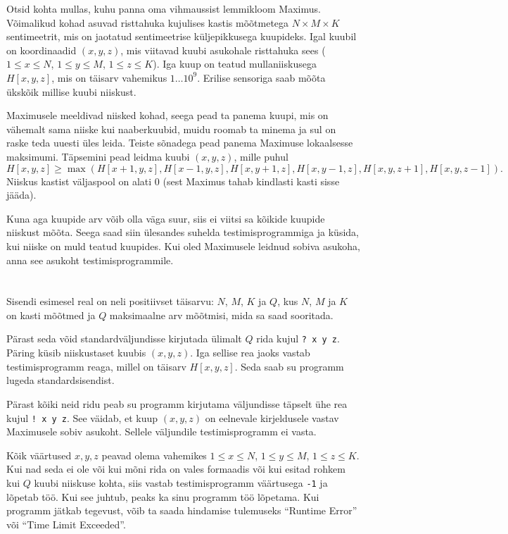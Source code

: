\ifx\boi\undefined\fi
\def\version{jury-1}

Otsid kohta mullas, kuhu panna oma vihmaussist lemmikloom Maximus. 
Võimalikud kohad asuvad risttahuka kujulises kastis mõõtmetega $N \times M \times K$ sentimeetrit, 
mis on jaotatud sentimeetrise küljepikkusega kuupideks. Igal kuubil on koordinaadid $(x,y,z)$, 
mis viitavad kuubi asukohale risttahuka sees ($1 \le x \le N$, $1 \le y \le M$, $1 \le z \le K$). 
Iga kuup on teatud mullaniiskusega $H[x,y,z]$, mis on täisarv vahemikus $1 \dots 10^9$. 
Erilise sensoriga saab mõõta ükskõik millise kuubi niiskust.

Maximusele meeldivad niisked kohad, seega pead ta panema kuupi, mis on vähemalt sama niiske kui naaberkuubid, 
muidu roomab ta minema ja sul on raske teda uuesti üles leida.
Teiste sõnadega pead panema Maximuse lokaalsesse maksimumi.
Täpsemini pead leidma kuubi $(x,y,z)$, mille puhul
$$
H[x,y,z] \ge \max(H[x+1,y,z], H[x-1,y,z], H[x,y+1,z], H[x,y-1,z], H[x,y,z+1], H[x,y,z-1]).
$$
Niiskus kastist väljaspool on alati $0$ (sest Maximus tahab kindlasti kasti sisse jääda).

Kuna aga kuupide arv võib olla väga suur, siis ei viitsi sa kõikide kuupide niiskust mõõta. Seega saad siin ülesandes suhelda testimisprogrammiga ja küsida, kui niiske on muld teatud kuupides.
Kui oled Maximusele leidnud sobiva asukoha, anna see asukoht testimisprogrammile.

\section*{\interactivity}
Sisendi esimesel real on neli positiivset täisarvu: $N$, $M$, $K$ ja $Q$, kus $N$, $M$ ja $K$ on kasti mõõtmed ja $Q$ maksimaalne arv mõõtmisi, mida sa saad sooritada.

Pärast seda võid standardväljundisse kirjutada ülimalt $Q$ rida kujul \texttt{?\ x y z}.
Päring küsib niiskustaset kuubis $(x, y, z)$.
Iga sellise rea jaoks vastab testimisprogramm reaga, millel on täisarv $H[x,y,z]$. Seda saab su programm lugeda standardsisendist.

Pärast kõiki neid ridu peab su programm kirjutama väljundisse täpselt ühe rea kujul \texttt{!\ x y z}.
See väidab, et kuup $(x, y, z)$ on eelnevale kirjeldusele vastav Maximusele sobiv asukoht.
Sellele väljundile testimisprogramm ei vasta.

Kõik väärtused $x, y, z$ peavad olema vahemikes $1 \le x \le N$, $1 \le y \le M$, $1 \le z \le K$.
Kui nad seda ei ole või kui mõni rida on vales formaadis või kui esitad rohkem kui $Q$ kuubi niiskuse kohta,
siis vastab testimisprogramm väärtusega \texttt{-1} ja lõpetab töö.
Kui see juhtub, peaks ka sinu programm töö lõpetama. Kui programm jätkab tegevust, võib ta 
saada hindamise tulemuseks ``Runtime Error'' või ``Time Limit Exceeded''.

